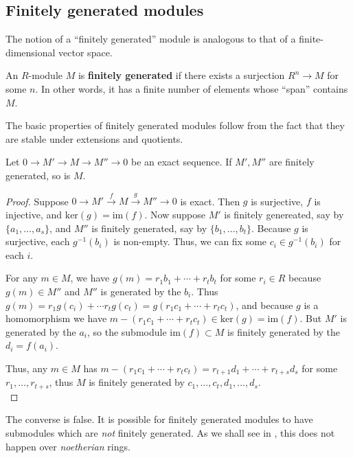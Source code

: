 \subsection{Finitely generated modules}

The notion of a ``finitely generated'' module is analogous to that of a
finite-dimensional vector space.

\begin{definition} 
An $R$-module $M$ is \textbf{finitely generated} if there exists a surjection
$R^n \to M$ for some $n$. In other words, it has a finite number of elements
whose ``span'' contains $M$.
\end{definition} 

The basic properties of finitely generated modules follow from the fact that
they are stable under extensions and quotients.

\begin{proposition} \label{exact-fingen}
Let $0 \to M' \to M \to M'' \to 0$ be an exact sequence. If $M', M''$ are
finitely generated, so is $M$.
\end{proposition} 
\begin{proof} 
Suppose $0\rightarrow
M'\stackrel{f}{\rightarrow}M\stackrel{g}{\rightarrow}M''\rightarrow0$
is exact. Then $g$ is surjective, $f$ is injective, and
$\text{ker}(g)=\text{im}(f)$. Now suppose $M'$ is finitely genereated,
say by $\{a_1,\ldots,a_s\}$, and $M''$ is finitely generated, say by
$\{b_1,\ldots,b_t\}$. Because $g$ is surjective, each $g^{-1}(b_i)$ is
non-empty. Thus, we can fix some $c_i\in g^{-1}(b_i)$ for each $i$.

For any
$m\in M$, we have $g(m)=r_1b_1+\cdots+r_tb_t$ for some $r_i\in R$ because
$g(m)\in M''$ and $M''$ is generated by the $b_i$. Thus $g(m)=r_1g(c_i)+\cdots
r_tg(c_t)=g(r_1c_1+\cdots+r_tc_t)$, and because $g$ is a homomorphism
we have $m-(r_1c_1+\cdots+r_tc_t)\in\text{ker}(g)=\text{im}(f)$. But
$M'$ is generated by the $a_i$, so the submodule $\text{im}(f)\subset
M$ is finitely generated by the $d_i=f(a_i)$.

Thus, any $m\in
M$ has $m-(r_1c_1+\cdots+r_tc_t)=r_{t+1}d_1+\cdots+r_{t+s}d_s$
for some $r_1,\ldots,r_{t+s}$, thus $M$ is finitely generated by
$c_1,\ldots,c_t,d_1,\ldots,d_s$.  \\

\end{proof} 

The converse is false. It is possible for finitely generated modules to have
submodules which are \emph{not} finitely generated. As we shall see in
, this does not happen over \emph{noetherian} rings.



